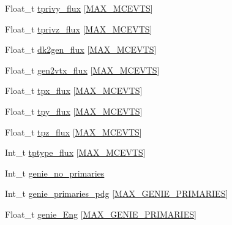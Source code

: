 \begin{DoxyCompactItemize}
\item 
Float\-\_\-t \hyperlink{classanatree_aa65ed469de15f9b9bfd73fe96daa209e}{tprivy\-\_\-flux} \mbox{[}\hyperlink{anatree__core__v09410002_8h_aaa5b2c5d6288820484963683ee7c31aa}{M\-A\-X\-\_\-\-M\-C\-E\-V\-T\-S}\mbox{]}
\item 
Float\-\_\-t \hyperlink{classanatree_ab0f4aded779c8bf3f597478a5c6f3e1a}{tprivz\-\_\-flux} \mbox{[}\hyperlink{anatree__core__v09410002_8h_aaa5b2c5d6288820484963683ee7c31aa}{M\-A\-X\-\_\-\-M\-C\-E\-V\-T\-S}\mbox{]}
\item 
Float\-\_\-t \hyperlink{classanatree_a3d9b893bf93729a11d962070a700902d}{dk2gen\-\_\-flux} \mbox{[}\hyperlink{anatree__core__v09410002_8h_aaa5b2c5d6288820484963683ee7c31aa}{M\-A\-X\-\_\-\-M\-C\-E\-V\-T\-S}\mbox{]}
\item 
Float\-\_\-t \hyperlink{classanatree_a269bdd985ff6d66b097bf6c0399181f8}{gen2vtx\-\_\-flux} \mbox{[}\hyperlink{anatree__core__v09410002_8h_aaa5b2c5d6288820484963683ee7c31aa}{M\-A\-X\-\_\-\-M\-C\-E\-V\-T\-S}\mbox{]}
\item 
Float\-\_\-t \hyperlink{classanatree_abee767b97e1f58336b63d69b188bf2bb}{tpx\-\_\-flux} \mbox{[}\hyperlink{anatree__core__v09410002_8h_aaa5b2c5d6288820484963683ee7c31aa}{M\-A\-X\-\_\-\-M\-C\-E\-V\-T\-S}\mbox{]}
\item 
Float\-\_\-t \hyperlink{classanatree_a255de917c2844a31e6185c611dc7913a}{tpy\-\_\-flux} \mbox{[}\hyperlink{anatree__core__v09410002_8h_aaa5b2c5d6288820484963683ee7c31aa}{M\-A\-X\-\_\-\-M\-C\-E\-V\-T\-S}\mbox{]}
\item 
Float\-\_\-t \hyperlink{classanatree_a0767befdb5d471ec79819c9f3aff9030}{tpz\-\_\-flux} \mbox{[}\hyperlink{anatree__core__v09410002_8h_aaa5b2c5d6288820484963683ee7c31aa}{M\-A\-X\-\_\-\-M\-C\-E\-V\-T\-S}\mbox{]}
\item 
Int\-\_\-t \hyperlink{classanatree_a4129cd59ebbe7e5112966e2ddcb52e4b}{tptype\-\_\-flux} \mbox{[}\hyperlink{anatree__core__v09410002_8h_aaa5b2c5d6288820484963683ee7c31aa}{M\-A\-X\-\_\-\-M\-C\-E\-V\-T\-S}\mbox{]}
\item 
Int\-\_\-t \hyperlink{classanatree_aa01aa64ca4503514365663b0071e52c3}{genie\-\_\-no\-\_\-primaries}
\item 
Int\-\_\-t \hyperlink{classanatree_ac6f98b857e5f3e95719f0583c8481009}{genie\-\_\-primaries\-\_\-pdg} \mbox{[}\hyperlink{anatree__core__v09410002_8h_a2b21972a7445ecb7aae4c92a9c5ae1fa}{M\-A\-X\-\_\-\-G\-E\-N\-I\-E\-\_\-\-P\-R\-I\-M\-A\-R\-I\-E\-S}\mbox{]}
\item 
Float\-\_\-t \hyperlink{classanatree_af043b6371cd535eb566e58972a67220c}{genie\-\_\-\-Eng} \mbox{[}\hyperlink{anatree__core__v09410002_8h_a2b21972a7445ecb7aae4c92a9c5ae1fa}{M\-A\-X\-\_\-\-G\-E\-N\-I\-E\-\_\-\-P\-R\-I\-M\-A\-R\-I\-E\-S}\mbox{]}

\end{DoxyCompactItemize}
